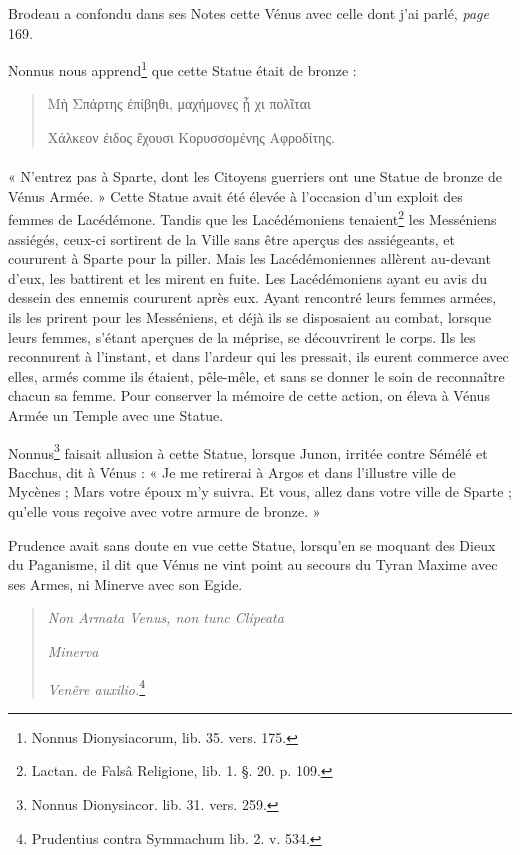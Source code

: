 \documentclass[a4paper, 11pt, oneside, polutonikogreek, french]{article}
\begin{document}
Brodeau a confondu dans ses Notes cette Vénus avec celle dont j'ai parlé, \emph{page} 169.

Nonnus nous apprend\footnote{Nonnus Dionysiacorum, lib. 35. vers. 175.} que cette Statue était de bronze :
\begin{quotation}
Μὴ Σπάρτης ἐπίβηθι, μαχήμονες ᾗ χι πολῖται

Χάλκεον ἐιδος ἔχουσι Κορυσσομένης Αφροδίτης.
\end{quotation}
\paragraph{}
« N'entrez pas à Sparte, dont les Citoyens guerriers ont une Statue de bronze de Vénus Armée. » Cette Statue avait été élevée à l'occasion d'un exploit des femmes de Lacédémone. Tandis que les Lacédémoniens tenaient\footnote{Lactan. de Falsâ Religione, lib. 1. §. 20. p. 109.} les Messéniens assiégés, ceux-ci sortirent de la Ville sans être aperçus des assiégeants, et coururent à Sparte pour la piller. Mais les Lacédémoniennes allèrent au-devant d'eux, les battirent et les mirent en fuite. Les Lacédémoniens ayant eu avis du dessein des ennemis coururent après eux. Ayant rencontré leurs femmes armées, ils les prirent pour les Messéniens, et déjà ils se disposaient au combat, lorsque leurs femmes, s'étant aperçues de la méprise, se découvrirent le corps. Ils les reconnurent à l'instant, et dans l'ardeur qui les pressait, ils eurent commerce avec elles, armés comme ils étaient, pêle-mêle, et sans se donner le soin de reconnaître chacun sa femme. Pour conserver la mémoire de cette action, on éleva à Vénus Armée un Temple avec une Statue.

Nonnus\footnote{Nonnus Dionysiacor. lib. 31. vers. 259.} faisait allusion à cette Statue, lorsque Junon, irritée contre Sémélé et Bacchus, dit à Vénus : « Je me retirerai à Argos et dans l'illustre ville de Mycènes ; Mars votre époux m'y suivra. Et vous, allez dans votre ville de Sparte ; qu'elle vous reçoive avec votre armure de bronze. »

Prudence avait sans doute en vue cette Statue, lorsqu'en se moquant des Dieux du Paganisme, il dit que Vénus ne vint point au secours du Tyran Maxime avec ses Armes, ni Minerve avec son Egide.
\begin{quotation}
\emph{Non Armata Venus, non tunc Clipeata}

\hspace*{5mm}\emph{Minerva}

\emph{Venêre auxilio.}\footnote{Prudentius contra Symmachum lib. 2. v. 534.}
\end{quotation}
\end{document}
